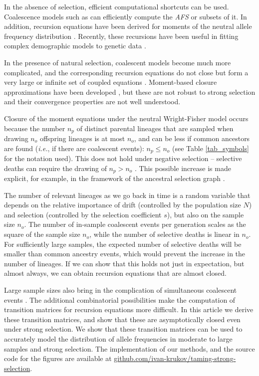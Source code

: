 \documentclass[review]{elsarticle}
\begin{document}
In the absence of selection, efficient computational shortcuts can be used. Coalescence models such
as \citep{fastsimcoal2, KammEtAl2017} can efficiently compute the \textit{AFS} or subsets of it. In
addition, recursion equations have been derived for moments of the neutral allele frequency
distribution \citep{KimuraCrow1964,Ewens1972,JouganousEtAl2017}. Recently, these recursions have
been useful in fitting complex demographic models to genetic data
\citep{JouganousEtAl2017,KammEtAl2017}.
 
In the presence of natural selection, coalescent models become much more complicated, and the
corresponding recursion equations do not close but
form a very large or infinite set of coupled equations \citep{DonnellyKurtz1999, JouganousEtAl2017}. Moment-based closure approximations
have been developed \citep{JouganousEtAl2017}, but these are not robust to strong selection and
their convergence properties are not well understood.

Closure of the moment equations under the neutral Wright-Fisher model occurs because the number $n_p$ of
distinct parental lineages that are sampled when drawing $n_o$ offspring lineages is at most $n_o$,
and can be less if common ancestors are found (\textit{i.e.}, if there are coalescent events): 
$n_p \le n_o$ (see Table \ref{tab_symbols} for the notation used). This does not
hold under negative selection -- selective deaths can require the drawing of $n_p>n_o$  \citep{DonnellyKurtz1999a,
  JouganousEtAl2017}. This possible increase is made explicit, for example, in the framework of the ancestral
selection graph \citep{KroneNeuhauser1997}.

The number of relevant lineages as we go back in time is a random variable that depends on the relative
importance of drift (controlled by the population size $N$) and selection (controlled by the selection coefficient $s$), but also on the sample size $n_o$. 
The number of in-sample coalescent events per generation scales as the square of the sample size $n_o$,
while the number of selective deaths is linear in $n_o$. For sufficiently large
samples, the expected number of selective deaths will be smaller than common ancestry events, which would prevent the
increase in the number of lineages. If we can show that this holds not just in expectation, but almost always,  
we can obtain recursion equations that are almost closed. 
 
Large sample sizes also bring in the complication of simultaneous coalescent events
\citep{BhaskarEtAl2014}. The additional combinatorial possibilities make the computation of
transition matrices for recursion equations more difficult. In this article we derive these
transition matrices, and show that these are asymptotically closed even under strong selection. We
show that these transition matrices can be used to accurately model the distribution of allele
frequencies in moderate to large samples and strong selection. The implementation of our methods,
and the source code for the figures are available at
\url{github.com/ivan-krukov/taming-strong-selection}.
\end{document}
